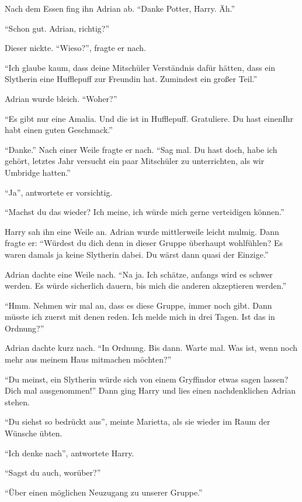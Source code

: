 Nach dem Essen fing ihn Adrian ab. \enquote{Danke Potter, Harry. Äh.}

\enquote{Schon gut. Adrian, richtig?}

Dieser nickte. \enquote{Wieso?}, fragte er nach.

\enquote{Ich glaube kaum, dass deine Mitschüler Verständnis dafür hätten, dass ein Slytherin eine Hufflepuff zur Freundin hat. Zumindest ein großer Teil.}

Adrian wurde bleich. \enquote{Woher?}

\enquote{Es gibt nur eine Amalia. Und die ist in Hufflepuff. \gst Gratuliere. Du hast einen\abs Ihr habt einen guten Geschmack.}

\enquote{Danke.} Nach einer Weile fragte er nach. \enquote{Sag mal. Du hast doch, habe ich gehört, letztes Jahr versucht ein paar Mitschüler zu unterrichten, als wir Umbridge hatten.}

\enquote{Ja}, antwortete er vorsichtig.

\enquote{Machst du das wieder? Ich meine, ich würde mich gerne verteidigen können.}

Harry sah ihn eine Weile an. Adrian wurde mittlerweile leicht mulmig. Dann fragte er: \enquote{Würdest du dich denn in dieser Gruppe überhaupt wohlfühlen? Es waren damals ja keine Slytherin dabei. Du wärst dann quasi der Einzige.}

Adrian dachte eine Weile nach. \enquote{Na ja. Ich schätze, anfangs wird es schwer werden. Es würde sicherlich dauern, bis mich die anderen akzeptieren werden.}

\enquote{Hmm. Nehmen wir mal an, dass es diese Gruppe, immer noch gibt. Dann müsste ich zuerst mit denen reden. Ich melde mich in drei Tagen. Ist das in Ordnung?}

Adrian dachte kurz nach. \enquote{In Ordnung. Bis dann. \gst Warte mal. Was ist, wenn noch mehr aus meinem Haus mitmachen möchten?}

\enquote{Du meinst, ein Slytherin würde sich von einem Gryffindor etwas sagen lassen? Dich mal ausgenommen!} Dann ging Harry und lies einen nachdenklichen Adrian stehen.

\trenn

\enquote{Du siehst so bedrückt aus}, meinte Marietta, als sie wieder im Raum der Wünsche übten.

\enquote{Ich denke nach}, antwortete Harry.

\enquote{Sagst du auch, worüber?}

\enquote{Über einen möglichen Neuzugang zu unserer Gruppe.}

